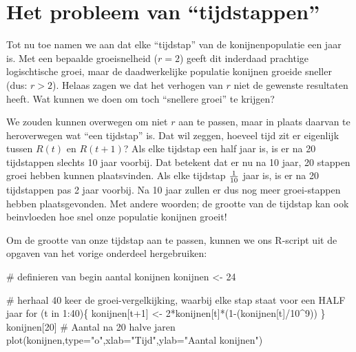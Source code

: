 \documentclass[
  a4paper,
]{scrbook}
\newenvironment{Shaded}{\begin{snugshade}}{\end{snugshade}}
\newcommand{\AttributeTok}[1]{\textcolor[rgb]{0.40,0.45,0.13}{#1}}
\newcommand{\CommentTok}[1]{\textcolor[rgb]{0.37,0.37,0.37}{#1}}
\newcommand{\ControlFlowTok}[1]{\textcolor[rgb]{0.00,0.23,0.31}{#1}}
\newcommand{\DecValTok}[1]{\textcolor[rgb]{0.68,0.00,0.00}{#1}}
\newcommand{\FunctionTok}[1]{\textcolor[rgb]{0.28,0.35,0.67}{#1}}
\newcommand{\NormalTok}[1]{\textcolor[rgb]{0.00,0.23,0.31}{#1}}
\newcommand{\OtherTok}[1]{\textcolor[rgb]{0.00,0.23,0.31}{#1}}
\newcommand{\SpecialCharTok}[1]{\textcolor[rgb]{0.37,0.37,0.37}{#1}}
\newcommand{\StringTok}[1]{\textcolor[rgb]{0.13,0.47,0.30}{#1}}
\theoremstyle{definition}
\theoremstyle{remark}
\begin{document}
\hypertarget{het-probleem-van-tijdstappen}{%
\section{Het probleem van
``tijdstappen''}\label{het-probleem-van-tijdstappen}}

Tot nu toe namen we aan dat elke ``tijdstap'' van de konijnenpopulatie
een jaar is. Met een bepaalde groeisnelheid (\(r=2\)) geeft dit
inderdaad prachtige logischtische groei, maar de daadwerkelijke
populatie konijnen groeide sneller (dus: \(r>2\)). Helaas zagen we dat
het verhogen van \(r\) niet de gewenste resultaten heeft. Wat kunnen we
doen om toch ``snellere groei'' te krijgen?

We zouden kunnen overwegen om niet \(r\) aan te passen, maar in plaats
daarvan te heroverwegen wat ``een tijdstap'' is. Dat wil zeggen, hoeveel
tijd zit er eigenlijk tussen \(R(t)\) en \(R(t+1)\)? Als elke tijdstap
een half jaar is, is er na 20 tijdstappen slechts 10 jaar voorbij. Dat
betekent dat er nu na 10 jaar, 20 stappen groei hebben kunnen
plaatsvinden. Als elke tijdstap \(1 \over 10\) jaar is, is er na 20
tijdstappen pas 2 jaar voorbij. Na 10 jaar zullen er dus nog meer
groei-stappen hebben plaatsgevonden. Met andere woorden; de grootte van
de tijdstap kan ook beinvloeden hoe snel onze populatie konijnen groeit!

Om de grootte van onze tijdstap aan te passen, kunnen we ons R-script
uit de opgaven van het vorige onderdeel hergebruiken:

\begin{Shaded}
\begin{Highlighting}[]
\CommentTok{\# definieren van begin aantal konijnen}
\NormalTok{konijnen }\OtherTok{\textless{}{-}} \DecValTok{24}

\CommentTok{\# herhaal 40 keer de groei{-}vergelkijking, waarbij elke stap staat voor een HALF jaar}
\ControlFlowTok{for}\NormalTok{ (t }\ControlFlowTok{in} \DecValTok{1}\SpecialCharTok{:}\DecValTok{40}\NormalTok{)\{}
\NormalTok{  konijnen[t}\SpecialCharTok{+}\DecValTok{1}\NormalTok{] }\OtherTok{\textless{}{-}} \DecValTok{2}\SpecialCharTok{*}\NormalTok{konijnen[t]}\SpecialCharTok{*}\NormalTok{(}\DecValTok{1}\SpecialCharTok{{-}}\NormalTok{(konijnen[t]}\SpecialCharTok{/}\DecValTok{10}\SpecialCharTok{\^{}}\DecValTok{9}\NormalTok{))}
\NormalTok{\}}
\NormalTok{konijnen[}\DecValTok{20}\NormalTok{] }\CommentTok{\# Aantal na 20 halve jaren}
\FunctionTok{plot}\NormalTok{(konijnen,}\AttributeTok{type=}\StringTok{"o"}\NormalTok{,}\AttributeTok{xlab=}\StringTok{"Tijd"}\NormalTok{,}\AttributeTok{ylab=}\StringTok{"Aantal konijnen"}\NormalTok{)}
\end{Highlighting}
\end{Shaded}
\end{document}
